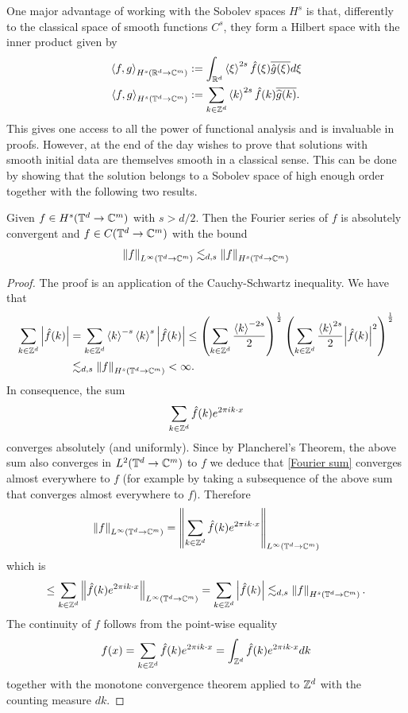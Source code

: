 \documentclass[
    a4paper,
    DIV=14,
    abstract=true,
    numbers=noenddot
]{scrartcl}
\begin{document}
One major advantage of working with the Sobolev spaces $H^s$ is that, differently to the classical space of smooth functions $C^s$, they form a Hilbert space with the inner product given by
\begin{align*}
	\left\langle f,g\right\rangle_{H^s(\mathbb{R}^d\to\mathbb{C}^m)}  & :=\int_{\mathbb{R}^d}\left\langle\xi \right\rangle^{2s}\hat{f}(\xi )\overline{\hat{g}(\xi )} d\xi\\
	\left\langle f,g\right\rangle_{H^s(\mathbb{T}^d\to\mathbb{C}^m)} & :=\sum_{k\in \mathbb{Z}^d} \left\langle k \right\rangle^{2s}\hat{f}(k)\overline{\widehat{g}(k )}.
\end{align*}
This gives one access to all the power of functional analysis and is invaluable in proofs. However,  at the end of the day wishes to prove that solutions with smooth initial data are themselves smooth in a classical sense. This can be done by showing that the solution belongs to a Sobolev space of high enough order together with the following two results.
\begin{lemma}\label{Sobolev derivatives embedding periodic}
	Given $f\in H^{s}(\mathbb{T}^d\to\mathbb{C}^m)$ with $s>d/2$. Then the Fourier series of $f$ is absolutely convergent and $f\in C(\mathbb{T}^d\to\mathbb{C}^m)$ with the bound
	\[\left\lVert f \right\rVert_{L^\infty(\mathbb{T}^d\to\mathbb{C}^m)}\lesssim_{d,s}\left\lVert f \right\rVert_{H^s(\mathbb{T}^d\to\mathbb{C}^m)}\]
\end{lemma}
\begin{proof}
	The proof is an application of the Cauchy-Schwartz inequality. We have that
	\begin{align*}
		\sum_{k\in\mathbb{Z}^d}{\left| \hat{f}(k) \right|}&=\sum_{k\in\mathbb{Z}^d} \left\langle k\right\rangle^{-s}\left\langle k\right\rangle^{s}{\left| \hat{f}(k) \right|}\leq\left(\sum_{k\in\mathbb{Z}^d} \frac{\left\langle k\right\rangle^{-2s}}{2}\right)^{\frac{1}{2}}\left(\sum_{k\in\mathbb{Z}^d}\frac{\left\langle k\right\rangle^{2s}}{2}{\left| \hat{f}(k) \right|}^2\right)^{\frac{1}{2}}\\
				&\lesssim_{d,s}\left\lVert f \right\rVert_{H^s(\mathbb{T}^d\to\mathbb{C}^m)}<\infty.
	\end{align*}
	In consequence, the sum
	\begin{equation}\label{Fourier sum}
		\sum_{k\in\mathbb{Z}^d}\hat{f}(k)e^{2\pi ik\cdot x}
	\end{equation}
	converges absolutely (and uniformly). Since by Plancherel's Theorem, the above sum also converges in $L^2(\mathbb{T}^d\to\mathbb{C}^m)$ to $f$ we deduce that \eqref{Fourier sum} converges almost everywhere to $f$ (for example by taking a subsequence of the above sum that converges almost everywhere to $f$). Therefore
	\[\left\lVert f \right\rVert_{L^\infty(\mathbb{T}^d\to\mathbb{C}^m)}=\left\lVert \sum_{k\in\mathbb{Z}^d}\hat{f}(k)e^{2\pi ik\cdot x} \right\rVert_{L^\infty(\mathbb{T}^d\to\mathbb{C}^m)}\]
	which is
	\[\leq\sum_{k\in\mathbb{Z}^d}\left\lVert \hat{f}(k)e^{2\pi ik\cdot x} \right\rVert_{L^\infty(\mathbb{T}^d\to\mathbb{C}^m)}=\sum_{k\in\mathbb{Z}^d}{\left| \hat{f}(k) \right|}\lesssim_{d,s}\left\lVert f \right\rVert_{H^s(\mathbb{T}^d\to\mathbb{C}^m)}.\]
	The continuity of $f$ follows from the point-wise equality
	\begin{equation}\label{pointwise convergence Fourier sum}
		f(x)=\sum_{k\in\mathbb{Z}^d}\hat{f}(k)e^{2\pi ik\cdot x}=\int_{\mathbb{Z}^d} \hat{f}(k)e^{2\pi ik\cdot x} dk
	\end{equation}
	together with the monotone convergence theorem applied to $\mathbb{Z}^d$ with the counting measure $dk$.
\end{proof}
\end{document}
